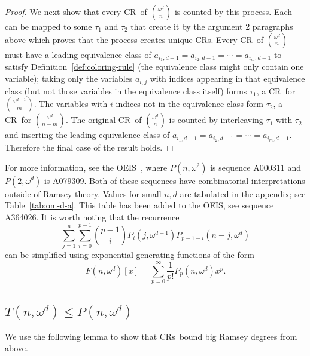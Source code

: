 \documentclass[11pt]{article}
\newcommand{\om}{\omega}
\newcommand{\crulenospace}{CR}
\newcommand{\crule}{\crulenospace~}
\newcommand{\crules}{\crulenospace s~}
\newcommand{\crulesnospace}{\crulenospace s}
\newcommand{\numpoints}{n}
\newcommand{\inumpoints}{i}
\newcommand{\idegr}{j}
\newcommand{\commonconst}{a}
\theoremstyle{plain}
\theoremstyle{definition}
\begin{document}
\begin{proof}
We next show that every \crule of $\binom{\om^d}{\numpoints}$ is counted by this process. Each can be mapped to some $\tau_1$ and $\tau_2$ that create it by the argument 2 paragraphs above which proves that the process creates unique \crulesnospace. Every \crule of $\binom{\om^d}{\numpoints}$ must have a leading equivalence class of $\commonconst_{\inumpoints_1,d-1} = \commonconst_{\inumpoints_2,d-1} = \cdots = \commonconst_{\inumpoints_m,d-1}$ to 
satisfy Definition~\ref{def:coloring-rule} 
(the equivalence class might only contain one variable); taking only the variables $\commonconst_{\inumpoints,\idegr}$ with indices appearing in that equivalence class (but not those variables in the equivalence class itself) forms $\tau_1$, a \crule for $\binom{\om^{d-1}}{m}$. The variables with $\inumpoints$ indices not in the equivalence class form $\tau_2$, a \crule for $\binom{\om^d}{\numpoints-m}$. The original \crule of $\binom{\om^d}{\numpoints}$ is counted by interleaving $\tau_1$ with $\tau_2$ and inserting the leading equivalence class of $\commonconst_{\inumpoints_1,d-1} = \commonconst_{\inumpoints_2,d-1} = \cdots = \commonconst_{\inumpoints_m,d-1}$.
Therefore the final case of the result holds.
\end{proof}

For more information, see the OEIS~\cite{OEIS}, where $P(\numpoints,\om^2)$ is sequence A000311 and $P(2,\om^d)$ is A079309. Both of these
sequences have combinatorial interpretations outside of Ramsey
theory.
Values for small $\numpoints,d$ are tabulated in the appendix; see Table~\ref{tab:om-d-a}. This table has been added to the OEIS, see sequence A364026. It is worth noting that the recurrence $$
\sum\limits_{j=1}^\numpoints \sum\limits_{i=0}^{p-1} \binom{p-1}{i} P_i \left( j,\om^{d-1} \right) P_{p-1-i} \left( \numpoints-j,\om^d\right)
$$ can be simplified using exponential generating functions of the form $$
F(n,\om^d)[x] = \sum_{p=0}^\infty \frac{1}{p!} P_p(n,\om^d) x^p.
$$

\subsection{\texorpdfstring{$T(\numpoints,\om^d) \leq P(\numpoints,\om^d)$}
 {T(\numpoints, omega d) <= P(\numpoints, omega d)}}

We use the following lemma to show that \crules bound big Ramsey degrees from above.
\end{document}
